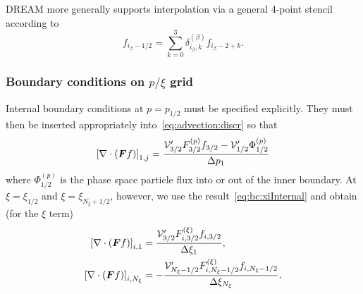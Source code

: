 \documentclass{notes}
\newcommand{\Vp}{\mathcal{V}'}
\begin{document}
    DREAM more generally supports interpolation via a general 4-point stencil according to
    \begin{equation}
        f_{i_\beta-1/2} = \sum_{k=0}^3 \delta^{(\beta)}_{i_\beta,k} f_{i_\beta-2+k}.
    \end{equation}
    

    \subsubsection{Boundary conditions on $p/\xi$ grid}
    Internal boundary conditions at $p=p_{1/2}$ must be specified explicitly.
    They must then be inserted appropriately into~\eqref{eq:advection:discr} so
    that
    \begin{equation}
        \left[ \nabla\cdot\left( \bb{F}f \right) \right]_{1,j} = \frac{
            \Vp_{3/2} F_{3/2}^{(p)} f_{3/2} - \Vp_{1/2}\Phi^{(p)}_{1/2}
        }{\Delta p_{1}}
    \end{equation}
    where $\Phi_{1/2}^{(p)}$ is the phase space particle flux into or out of
    the inner boundary. At $\xi=\xi_{1/2}$ and $\xi=\xi_{N_\xi+1/2}$, however,
    we use the result~\eqref{eq:bc:xiInternal} and obtain (for the $\xi$ term)
    \begin{equation}
        \begin{aligned}
            \left[ \nabla\cdot\left( \bb{F} f \right) \right]_{i,1} &=
                \frac{\Vp_{3/2} F^{(\xi)}_{i,3/2} f_{i,3/2}}{\Delta\xi_{1}},\\
            \left[ \nabla\cdot\left( \bb{F} f \right) \right]_{i,N_\xi} &=
                -\frac{\Vp_{N_\xi-1/2} F^{(\xi)}_{i,N_\xi-1/2} f_{i,N_\xi-1/2}}{\Delta\xi_{N_\xi}}.
        \end{aligned}
    \end{equation}
\end{document}
